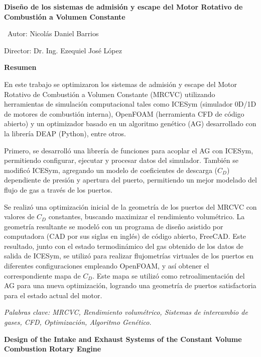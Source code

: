\newpage \thispagestyle{plain}

\begin{center} \large{\textbf{{Diseño de los sistemas de admisión y escape del
Motor Rotativo de Combustión a Volumen Constante}}}\\
\end{center} %

\normalsize \ \hfill Autor: Nicolás Daniel Barrios

\hfill Director: Dr. Ing. Ezequiel José López


\textbf{Resumen}

En este trabajo se optimizaron los sistemas de admisión y escape del Motor
Rotativo de Combustión a Volumen Constante (MRCVC) utilizando herramientas de
simulación computacional tales como ICESym (simulador 0D/1D de motores de
combustión interna), OpenFOAM (herramienta CFD de código abierto) y un
optimizador basado en un algoritmo genético (AG) desarrollado con la librería
DEAP (Python), entre otros.

Primero, se desarrolló una librería de funciones para acoplar el AG con ICESym,
permitiendo configurar, ejecutar y procesar datos del simulador.
%
También se modificó ICESym, agregando un modelo de coeficientes de descarga
($C_{D}$) dependiente de presión y apertura del puerto, permitiendo un mejor
modelado del flujo de gas a través de los puertos.

Se realizó una optimización inicial de la geometría de los puertos del MRCVC con
valores de $C_{D}$ constantes, buscando maximizar el rendimiento volumétrico.
%
La geometría resultante se modeló con un programa de diseño asistido por
computadora (CAD por sus siglas en inglés) de código abierto, FreeCAD.
%
Este resultado, junto con el estado termodinámico del gas obtenido de los datos
de salida de ICESym, se utilizó para realizar flujometrías virtuales de los
puertos en diferentes configuraciones empleando OpenFOAM, y así obtener el
correspondiente mapa de $C_{D}$.
%
Este mapa se utilizó como retroalimentación del AG para una nueva optimización,
logrando una geometría de puertos satisfactoria para el estado actual del motor.

\noindent

\textit{Palabras clave: MRCVC, Rendimiento volumétrico, Sistemas de intercambio
de gases, CFD, Optimización, Algoritmo Genético.}

\newpage \thispagestyle{plain} %

\begin{center} \large{\textbf{{Design of the Intake and Exhaust Systems of the
Constant Volume Combustion Rotary Engine}}}\
\end{center} %

